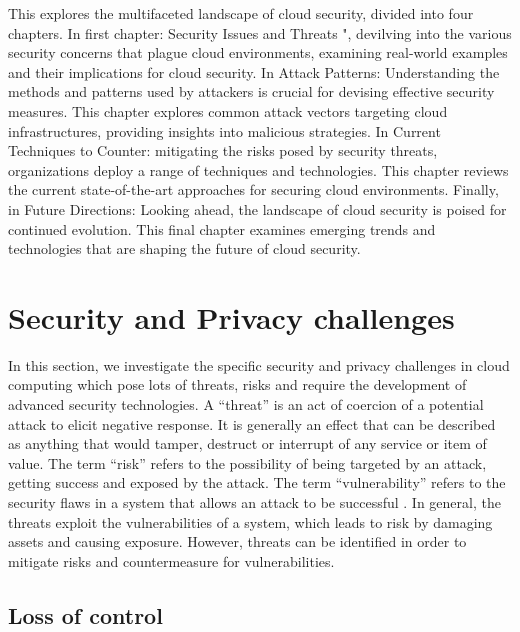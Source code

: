 \documentclass[twocolumn]{article}
\begin{document}
\textcolor{red}{\lipsum[1]}




This explores the multifaceted landscape of cloud security, divided into four chapters. In first chapter:  Security Issues and Threats ", devilving into the various security concerns that plague cloud environments, examining real-world examples and their implications for cloud security. In Attack Patterns: Understanding the methods and patterns used by attackers is crucial for devising effective security measures. This chapter explores common attack vectors targeting cloud infrastructures, providing insights into malicious strategies. In Current Techniques to Counter: mitigating the risks posed by security threats, organizations deploy a range of techniques and technologies. This chapter reviews the current state-of-the-art approaches for securing cloud environments. Finally, in Future Directions: Looking ahead, the landscape of cloud security is poised for continued evolution. This final chapter examines emerging trends and technologies that are shaping the future of cloud security.

 
\section{Security and Privacy challenges} 

In this section, we investigate the specific security and privacy challenges in cloud computing which pose lots of threats, risks and require the development of advanced security technologies.
A “threat” is an act of coercion of a potential attack to elicit negative response. It is generally an effect that can be described as anything that would tamper, destruct or interrupt of any service or item of value. The term “risk” refers to the possibility of being targeted by an attack, getting success and exposed by the attack. The term “vulnerability” refers to the security flaws in a system that allows an attack to be successful . In general, the threats exploit the vulnerabilities of a system, which leads to risk by damaging assets and causing exposure. However, threats can be identified in order to mitigate risks and countermeasure for vulnerabilities.







\subsection{Loss of control} 
\end{document}
